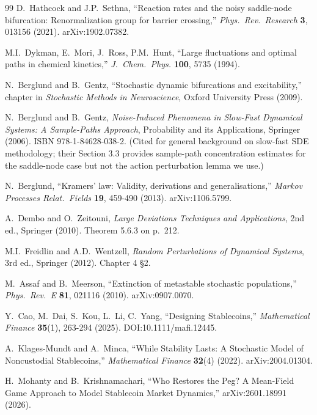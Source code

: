 \documentclass[11pt,a4paper]{article}
\theoremstyle{plain}
\theoremstyle{definition}
\begin{document}
\begin{thebibliography}{99}
 D.~Hathcock and J.P.~Sethna, ``Reaction rates and the noisy saddle-node bifurcation: Renormalization group for barrier crossing,'' \textit{Phys.\ Rev.\ Research} \textbf{3}, 013156 (2021). arXiv:1902.07382.

 M.I.~Dykman, E.~Mori, J.~Ross, P.M.~Hunt, ``Large fluctuations and optimal paths in chemical kinetics,'' \textit{J.\ Chem.\ Phys.} \textbf{100}, 5735 (1994).

 N.~Berglund and B.~Gentz, ``Stochastic dynamic bifurcations and excitability,'' chapter in \textit{Stochastic Methods in Neuroscience}, Oxford University Press (2009).

 N.~Berglund and B.~Gentz, \textit{Noise-Induced Phenomena in Slow-Fast Dynamical Systems: A Sample-Paths Approach}, Probability and its Applications, Springer (2006). ISBN 978-1-84628-038-2. (Cited for general background on slow-fast SDE methodology; their Section 3.3 provides sample-path concentration estimates for the saddle-node case but not the action perturbation lemma we use.)

 N.~Berglund, ``Kramers' law: Validity, derivations and generalisations,'' \textit{Markov Processes Relat.\ Fields} \textbf{19}, 459-490 (2013). arXiv:1106.5799.

 A.~Dembo and O.~Zeitouni, \textit{Large Deviations Techniques and Applications}, 2nd ed., Springer (2010). Theorem 5.6.3 on p.~212.

 M.I.~Freidlin and A.D.~Wentzell, \textit{Random Perturbations of Dynamical Systems}, 3rd ed., Springer (2012). Chapter 4 \S 2.

 M.~Assaf and B.~Meerson, ``Extinction of metastable stochastic populations,'' \textit{Phys.\ Rev.\ E} \textbf{81}, 021116 (2010). arXiv:0907.0070.

 Y.~Cao, M.~Dai, S.~Kou, L.~Li, C.~Yang, ``Designing Stablecoins,'' \textit{Mathematical Finance} \textbf{35}(1), 263-294 (2025). DOI:10.1111/mafi.12445.

 A.~Klages-Mundt and A.~Minca, ``While Stability Lasts: A Stochastic Model of Noncustodial Stablecoins,'' \textit{Mathematical Finance} \textbf{32}(4) (2022). arXiv:2004.01304.

 H.~Mohanty and B.~Krishnamachari, ``Who Restores the Peg? A Mean-Field Game Approach to Model Stablecoin Market Dynamics,'' arXiv:2601.18991 (2026).


\end{thebibliography}
\end{document}
